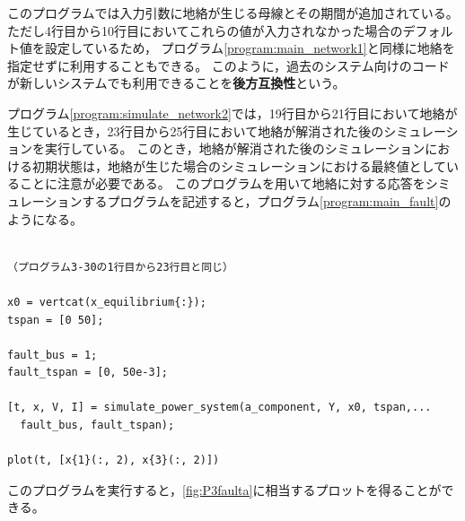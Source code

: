 \documentclass[tombow,dvipdfmx]{corona-a5-1.1}
\begin{document}
\begin{例}[地絡に対する応答のシミュレーション]
このプログラムでは入力引数に地絡が生じる母線とその期間が追加されている。
ただし4行目から10行目においてこれらの値が入力されなかった場合のデフォルト値を設定しているため，
プログラム\nobreak\ref{program:main_network1}と同様に地絡を指定せずに利用することもできる。
このように，過去のシステム向けのコードが新しいシステムでも利用できることを\textbf{後方互換性}という。

プログラム\nobreak\ref{program:simulate_network2}では，19行目から21行目において地絡が生じているとき，23行目から25行目において地絡が解消された後のシミュレーションを実行している。
このとき，地絡が解消された後のシミュレーションにおける初期状態は，地絡が生じた場合のシミュレーションにおける最終値としていることに注意が必要である。
このプログラムを用いて地絡に対する応答をシミュレーションするプログラムを記述すると，プログラム\nobreak\ref{program:main_fault}のようになる。
\begin{PROGRAMA}[count,title={main\_simulation\_3bus\_fault.m}]\label{program:main_fault}
\begin{verbatim}

（プログラム3-30の1行目から23行目と同じ）

x0 = vertcat(x_equilibrium{:});
tspan = [0 50];

fault_bus = 1;
fault_tspan = [0, 50e-3];

[t, x, V, I] = simulate_power_system(a_component, Y, x0, tspan,...
  fault_bus, fault_tspan);

plot(t, [x{1}(:, 2), x{3}(:, 2)])
\end{verbatim}
\end{PROGRAMA}

このプログラムを実行すると，\ref{fig:P3faulta}に相当するプロットを得ることができる。
\end{例}
\end{document}
